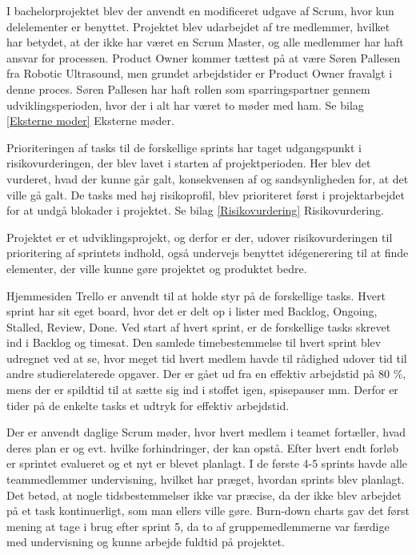 I bachelorprojektet blev der anvendt en modificeret udgave af Scrum, hvor kun delelementer er benyttet. Projektet blev udarbejdet af tre medlemmer, hvilket har betydet, at der ikke har været en Scrum Master, og alle medlemmer har haft ansvar for processen. Product Owner kommer tættest på at være Søren Pallesen fra Robotic Ultrasound, men grundet arbejdstider er Product Owner fravalgt i denne proces. Søren Pallesen har haft rollen som sparringspartner gennem udviklingsperioden, hvor der i alt har været to møder med ham. Se bilag \ref{Eksterne moder} Eksterne møder. 

Prioriteringen af tasks til de forskellige sprints har taget udgangspunkt i risikovurderingen, der blev lavet i starten af projektperioden. Her blev det vurderet, hvad der kunne går galt, konsekvensen af og sandsynligheden for, at det ville gå galt. De tasks med høj risikoprofil, blev prioriteret først i projektarbejdet for at undgå blokader i projektet. Se bilag \ref{Risikovurdering} Risikovurdering. 

Projektet er et udviklingsprojekt, og derfor er der, udover risikovurderingen til prioritering af sprintets indhold, også undervejs benyttet idégenerering til at finde elementer, der ville kunne gøre projektet og produktet bedre. 

Hjemmesiden Trello er anvendt til at holde styr på de forskellige tasks. Hvert sprint har sit eget board, hvor det er delt op i lister med Backlog, Ongoing, Stalled, Review, Done. Ved start af hvert sprint, er de forskellige tasks skrevet ind i Backlog og timesat. Den samlede timebestemmelse til hvert sprint blev udregnet ved at se, hvor meget tid hvert medlem havde til rådighed udover tid til andre studierelaterede opgaver. Der er gået ud fra en effektiv arbejdstid på 80 \%, mens der er spildtid til at sætte sig ind i stoffet igen, spisepauser mm. Derfor er tider på de enkelte tasks et udtryk for effektiv arbejdstid. 

Der er anvendt daglige Scrum møder, hvor hvert medlem i teamet fortæller, hvad deres plan er og evt. hvilke forhindringer, der kan opstå. Efter hvert endt forløb er sprintet evalueret og et nyt er blevet planlagt. I de første 4-5 sprints havde alle teammedlemmer undervisning, hvilket har præget, hvordan sprints blev planlagt. Det betød, at nogle tidsbestemmelser ikke var præcise, da der ikke blev arbejdet på et task kontinuerligt, som man ellers ville gøre. Burn-down charts gav det først mening at tage i brug efter sprint 5, da to af gruppemedlemmerne var færdige med undervisning og kunne arbejde fuldtid på projektet. 

